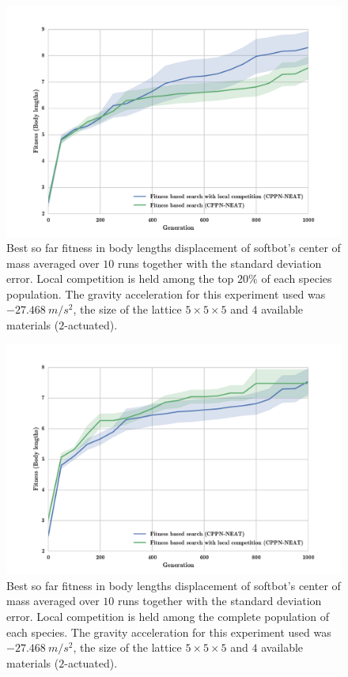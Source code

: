 \begin{figure}[h!]
\centering
\includegraphics[width=1.0\textwidth]{Figures/Results/FitVsFitCompSize5.pdf}
\caption{Best so far fitness in body lengths displacement of softbot's center of mass averaged over $10$ runs together with the standard deviation error. Local competition is held among the top $20\%$ of each species population. The gravity acceleration for this experiment used was $-27.468\   m/s^2$, the size of the lattice $5\times 5\times5$ and $4$ available materials ($2$-actuated).}
\label{fig:FitVsFitCompSize5}
\end{figure}

\begin{figure}[h!]
\centering
\includegraphics[width=1.0\textwidth]{Figures/Results/fitComp100percent.pdf}
\caption{Best so far fitness in body lengths displacement of softbot's center of mass averaged over $10$ runs together with the standard deviation error. Local competition is held among the complete population of each species. The gravity acceleration for this experiment used was $-27.468\   m/s^2$, the size of the lattice $5\times 5\times5$ and $4$ available materials ($2$-actuated).}
\label{fig:fitComp100percent}
\end{figure}










